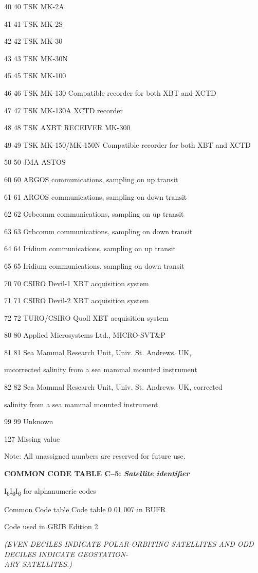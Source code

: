 40 40 TSK MK-2A

41 41 TSK MK-2S

42 42 TSK MK-30

43 43 TSK MK-30N

45 45 TSK MK-100

46 46 TSK MK-130 Compatible recorder for both XBT and XCTD

47 47 TSK MK-130A XCTD recorder

48 48 TSK AXBT RECEIVER MK-300

49 49 TSK MK-150/MK-150N Compatible recorder for both XBT and XCTD

50 50 JMA ASTOS

60 60 ARGOS communications, sampling on up transit

61 61 ARGOS communications, sampling on down transit

62 62 Orbcomm communications, sampling on up transit

63 63 Orbcomm communications, sampling on down transit

64 64 Iridium communications, sampling on up transit

65 65 Iridium communications, sampling on down transit

70 70 CSIRO Devil-1 XBT acquisition system

71 71 CSIRO Devil-2 XBT acquisition system

72 72 TURO/CSIRO Quoll XBT acquisition system

80 80 Applied Microsystems Ltd., MICRO-SVT\&P

81 81 Sea Mammal Research Unit, Univ. St. Andrews, UK,

uncorrected salinity from a sea mammal mounted instrument

82 82 Sea Mammal Research Unit, Univ. St. Andrews, UK, corrected

salinity from a sea mammal mounted instrument

99 99 Unknown

127 Missing value

Note: All unassigned numbers are reserved for future use.

\textbf{COMMON CODE TABLE C--5: \emph{Satellite identifier}}

I\textsubscript{6}I\textsubscript{6}I\textsubscript{6} for alphanumeric codes

Common Code table Code table 0 01 007 in BUFR

Code used in GRIB Edition 2

\emph{(EVEN DECILES INDICATE POLAR-ORBITING SATELLITES AND ODD DECILES INDICATE GEOSTATION-\\
ARY SATELLITES.)}

